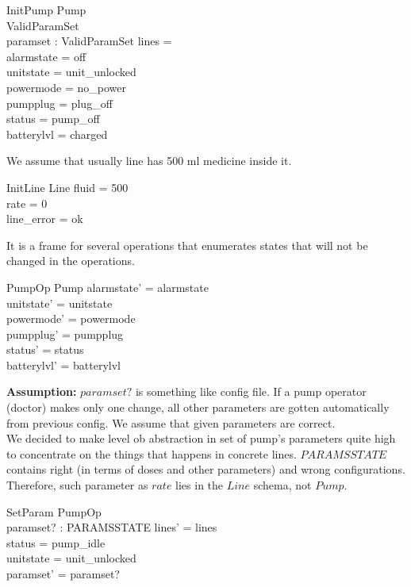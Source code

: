 \documentclass{article}
\begin{document}
	
	\begin{schema}{InitPump}
		Pump\\
		ValidParamSet\\
		paramset : ValidParamSet
		\where
		lines = \emptyset \\
		alarmstate = off \\
		unitstate  = unit\_unlocked \\
		powermode =  no\_power \\
		pumpplug = plug\_off \\
		status = pump\_off \\	
		batterylvl = charged\\
	\end{schema}
	
	We assume that usually line has 500 ml medicine inside it.
	\begin{schema}{InitLine}
		Line
		\where
		fluid = 500 \\
		rate = 0 \\
		line\_error = ok \\
	\end{schema}

	It is a frame for several operations that enumerates states that will not be changed in the operations.
	\begin{schema}{PumpOp}
		\Delta Pump
	\where
    	alarmstate' = alarmstate \\
    	unitstate' = unitstate \\
    	powermode' = powermode \\
    	pumpplug' = pumpplug\\
    	status' = status \\
    	batterylvl' = batterylvl
    \end{schema}
	


	\textbf{Assumption:}  $paramset?$ is something like config file. If a pump operator (doctor) makes only one change, all other parameters are gotten automatically from previous config. We assume that given parameters are correct.\\
	We decided to make level ob abstraction in set of pump's parameters quite high to concentrate on the things that happens in concrete lines. $PARAMSSTATE$ contains right (in terms of doses and other parameters) and wrong configurations. Therefore, such parameter as $rate$ lies in the $Line$ schema, not $Pump$.
	\begin{schema}{SetParam}
		PumpOp \\
		paramset? : PARAMSSTATE 
	\where
	    lines' = lines  \\
		status = pump\_idle \\ 
		unitstate = unit\_unlocked \\
		paramset' = paramset?
	\end{schema}
\end{document}
